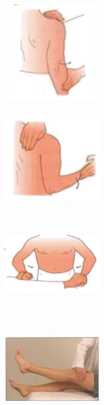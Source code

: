 \documentclass[a4paper,12pt]{book}
\begin{document}
{\begin{figure}[H]
		\begin{subfigure}[t]{.25\textwidth}
			\includegraphics[width=5cm,height=5cm]{./clinicalPhysioPic/motorSystem/supraspinatus.jpg}
		\end{subfigure}
		\hspace{\fill}
		\begin{subfigure}[t]{.25\textwidth}
			\includegraphics[width=5cm,height=5cm]{./clinicalPhysioPic/motorSystem/infraspinatus.jpg}
		\end{subfigure}
		\hspace{\fill}
		\begin{subfigure}[t]{.25\textwidth}
			\includegraphics[width=5cm,height=5cm]{./clinicalPhysioPic/motorSystem/pectoralisMajor.jpg}
		\end{subfigure}
		\hspace{\fill}
		\begin{subfigure}[t]{.25\textwidth}
			\includegraphics[width=5cm,height=5cm]{./clinicalPhysioPic/motorSystem/hipFlexion.jpg}

\end{subfigure}
\end{figure}}
\end{document}
